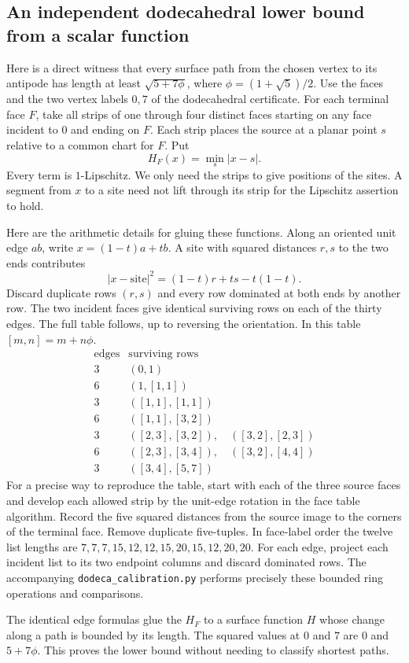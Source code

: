 \subsection{An independent dodecahedral lower bound from a scalar function}

Here is a direct witness that every surface path from the chosen vertex
to its antipode has length at least $\sqrt{5+7\phi}$, where
$\phi=(1+\sqrt5)/2$. Use the faces and the two vertex labels $0,7$ of
the dodecahedral certificate. For each terminal face $F$, take all
strips of one through four distinct faces starting on any face incident
to $0$ and ending on $F$. Each strip places the source at a planar
point $s$ relative to a common chart for $F$. Put
\[
 H_F(x)=\min_s |x-s|.
\]
Every term is $1$-Lipschitz. We only need the strips to give positions
of the sites. A segment from $x$ to a site need not lift through its
strip for the Lipschitz assertion to hold.

Here are the arithmetic details for gluing these functions.
Along an oriented unit edge $ab$, write
$x=(1-t)a+tb$. A site with squared distances $r,s$ to the two ends
contributes
\[
 |x-\text{site}|^2=(1-t)r+ts-t(1-t).
\]
Discard duplicate rows $(r,s)$ and every row dominated at both ends by
another row. The two incident faces give identical surviving rows on
each of the thirty edges. The full table follows, up to reversing
the orientation. In this table $[m,n]=m+n\phi$.
\[
\begin{array}{r|l}
\text{edges}&\text{surviving rows}\\ \hline
3&(0,1)\\
6&(1,[1,1])\\
3&([1,1],[1,1])\\
6&([1,1],[3,2])\\
3&([2,3],[3,2]),\quad([3,2],[2,3])\\
6&([2,3],[3,4]),\quad([3,2],[4,4])\\
3&([3,4],[5,7])
\end{array}
\]
For a precise way to reproduce the table, start with each of the three
source faces and develop each allowed strip by the unit-edge rotation
in the face table algorithm. Record the five squared distances from
the source image to the corners of the terminal face. Remove duplicate
five-tuples. In face-label order the twelve list lengths are
$7,7,7,15,12,12,15,20,15,12,20,20$. For each edge, project each
incident list to its two endpoint columns and discard dominated rows.
The accompanying \texttt{dodeca\_calibration.py} performs precisely
these bounded ring operations and comparisons.

The identical edge formulas glue the $H_F$ to a surface function $H$
whose change along a path is bounded by its length. The squared
values at $0$ and $7$ are $0$ and $5+7\phi$. This proves the lower
bound without needing to classify shortest paths.
